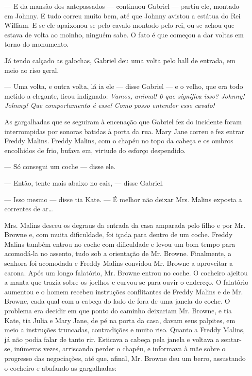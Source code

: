 --- E da mansão dos antepassados --- continuou Gabriel --- partiu ele,
montado em Johnny. E tudo correu muito bem, até que Johnny avistou a
estátua do Rei William. E se ele apaixonou-se pelo cavalo montado pelo
rei, ou se achou que estava de volta ao moinho, ninguém sabe. O fato é
que começou a dar voltas em
torno do monumento.

Já tendo calçado as galochas, Gabriel deu uma volta pelo hall de
entrada, em meio ao riso geral.

--- Uma volta, e outra volta, lá ia ele --- disse Gabriel --- e o
velho, que era todo metido a elegante, ficou indignado: \textit{Vamos, animal!
0 que significa isso? Johnny! Johnny! Que comportamento é esse! Como
posso entender esse cavalo!}

As gargalhadas que se seguiram à encenação que Gabriel fez do
incidente foram interrompidas por sonoras batidas à porta da rua. Mary
Jane correu e fez entrar Freddy Malins. Freddy Malins,
com o chapéu no topo da cabeça e os ombros encolhidos de frio, bufava
em, virtude do esforço despendido.

--- Só consegui um coche --- disse ele.

--- Então, tente mais abaixo no cais, --- disse Gabriel.

--- Isso mesmo --- disse tia Kate. --- É melhor não deixar Mrs. Malins
exposta a correntes de ar\ldots{}

Mrs. Malins desceu os degraus da entrada da casa amparada pelo filho e
por Mr. Browne e, com muita dificuldade, foi içada para dentro de um
coche. Freddy Malins também entrou no coche com dificuldade e levou um
bom tempo para acomodá-la no assento, tudo sob a orientação de Mr.
Browne. Finalmente, a senhora foi acomodada e Freddy Malins convidou
Mr. Browne a aproveitar a carona. Após um longo falatório, Mr. Browne
entrou no coche. O cocheiro ajeitou a manta que trazia sobre os
joelhos e curvou-se para ouvir o endereço. O falatório aumentou e o
homem recebeu instruções conflitantes de Freddy Malins e de Mr.
Browne, cada qual com a cabeça do lado de fora de uma janela do coche.
O problema era decidir em que ponto do caminho deixariam Mr. Browne,
e tia Kate, tia Julia e Mary Jane, de pé na porta da casa, davam seus
palpites, em meio a instruções truncadas, contradições e muito riso.
Quanto a Freddy Malins, já não podia falar de tanto rir. Esticava a
cabeça pela janela e voltava a sentar-se, inúmeras vezes, arriscando
perder o chapéu, e informava à mãe sobre o progresso das negociações,
até que, afinal, Mr. Browne deu um berro, assustando o cocheiro e
abafando as gargalhadas:

